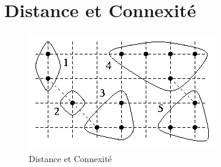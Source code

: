 \chapter{Distance et Connexité}

\begin{figure}[H]
    \centering
    \includegraphics[width=0.4 \textwidth]{Assets/distance et connexite.png}
    \caption{ Distance et Connexité }
    \label{fig:Distance et Connexité}
\end{figure}




